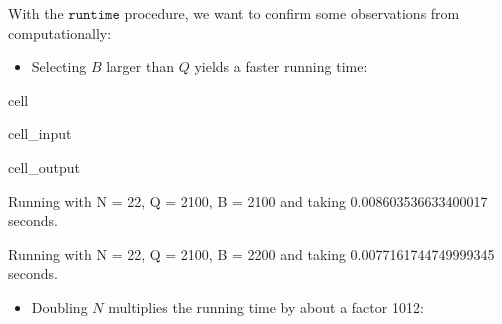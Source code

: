 \documentclass[letterpaper,10pt,english]{jupyterBook}
\begin{document}
\sphinxAtStartPar
With the \(\texttt{runtime}\) procedure, we want to confirm some observations from {\hyperref[\detokenize{Thesis:parameters-for-bootstrapping}]{}} computationally:
\begin{itemize}
\item {} 
\sphinxAtStartPar
Selecting \(B\) larger than \(Q\) yields a faster running time:

\end{itemize}

\begin{sphinxuseclass}{cell}\begin{sphinxVerbatimInput}

\begin{sphinxuseclass}{cell_input}
\begin{sphinxVerbatim}[commandchars=\\\{\}]
    
    
\end{sphinxVerbatim}

\end{sphinxuseclass}\end{sphinxVerbatimInput}
\begin{sphinxVerbatimOutput}

\begin{sphinxuseclass}{cell_output}
\begin{sphinxVerbatim}[commandchars=\\\{\}]
Running with N = 2\PYGZca{}2, Q = 2\PYGZca{}100, B = 2\PYGZca{}100 and taking 0.008603536633400017 seconds.
\end{sphinxVerbatim}

\begin{sphinxVerbatim}[commandchars=\\\{\}]
Running with N = 2\PYGZca{}2, Q = 2\PYGZca{}100, B = 2\PYGZca{}200 and taking 0.0077161744749999345 seconds.
\end{sphinxVerbatim}

\end{sphinxuseclass}\end{sphinxVerbatimOutput}

\end{sphinxuseclass}\begin{itemize}
\item {} 
\sphinxAtStartPar
Doubling \(N\) multiplies the running time by about a factor 10\sphinxhyphen{}12:

\end{itemize}
\end{document}
